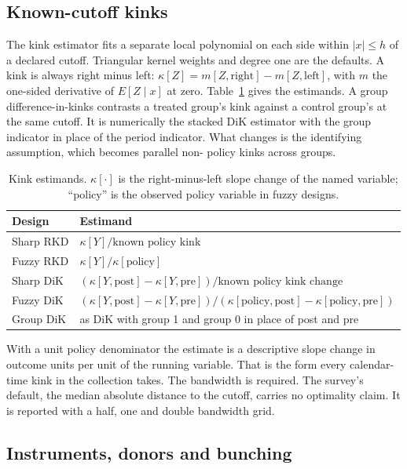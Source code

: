 \documentclass[11pt]{article}
\begin{document}
\subsection{Known-cutoff kinks}\label{sec:kinks}

The kink estimator fits a separate local polynomial on each side within $|x| \le h$ of a
declared cutoff. Triangular kernel weights and degree one are the defaults. A
kink is always right minus left: $\kappa[Z] = m[Z,\text{right}] - m[Z,\text{left}]$,
with $m$ the one-sided derivative of $E[Z \mid x]$ at zero. Table~\ref{tab:kinks} gives
the estimands. A group difference-in-kinks contrasts a treated group's kink against a
control group's at the same cutoff. It is numerically the stacked DiK estimator with the group indicator in place of the
period indicator. What changes is the identifying assumption, which becomes parallel non-
policy kinks across groups.

\begin{table}[t]
\centering
\small
\caption{Kink estimands. $\kappa[\cdot]$ is the right-minus-left slope change of the
named variable; ``policy'' is the observed policy variable in fuzzy designs.}
\label{tab:kinks}
\begin{tabular}{@{}ll@{}}
\toprule
Design & Estimand \\
\midrule
Sharp RKD & $\kappa[Y] / \text{known policy kink}$ \\
Fuzzy RKD & $\kappa[Y] / \kappa[\text{policy}]$ \\
Sharp DiK & $(\kappa[Y,\text{post}] - \kappa[Y,\text{pre}]) / \text{known policy kink change}$ \\
Fuzzy DiK & $(\kappa[Y,\text{post}] - \kappa[Y,\text{pre}]) / (\kappa[\text{policy},\text{post}] - \kappa[\text{policy},\text{pre}])$ \\
Group DiK & as DiK with group 1 and group 0 in place of post and pre \\
\bottomrule
\end{tabular}
\end{table}

With a unit policy denominator the estimate is a descriptive slope change in outcome
units per unit of the running variable. That is the form every calendar-time kink in the
collection takes. The bandwidth is required. The survey's default, the median absolute distance to the
cutoff, carries no optimality claim. It is reported with a half, one and double bandwidth
grid.

\subsection{Instruments, donors and bunching}\label{sec:others}
\end{document}
